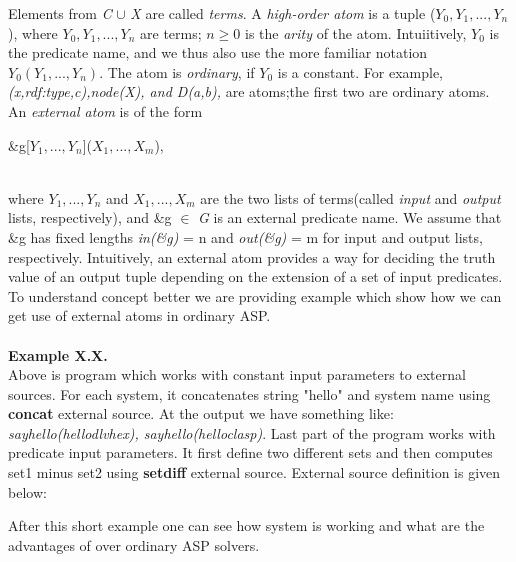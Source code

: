 \documentclass[14pt,a4paper, titlepage]{article}
\begin{document}
Elements from \textit{C} $\cup$ \textit{X} are called \textit{terms}. A \textit{high-order atom} is a tuple ($Y_0, Y_1,...,Y_n$), where $Y_0, Y_1,...,Y_n$ are terms; $ n \ge 0$ is the \textit{arity} of the atom. Intuiitively, $Y_0$ is the predicate name, and we thus also use the more familiar notation $Y_0(Y_1,...,Y_n)$. The atom is \textit{ordinary}, if $Y_0$ is a constant. For example, \textit{(x,rdf:type,c),node(X), and D(a,b),} are atoms;the first two are ordinary atoms. An \textit{external atom} is of the form \\ \centerline{ \&g[$Y_1,...,Y_n$]($X_1,...,X_m$),} \\where $Y_1,...,Y_n$ and $X_1,...,X_m$ are the two lists of terms(called \textit{input} and \textit{output} lists, respectively), and \&g $\in$ \textit{G} is an external predicate name. We assume that \&g has fixed lengths \textit{in(\&g)} = n and \textit{out(\&g)} = m for input and output lists, respectively. Intuitively, an external atom provides a way for deciding the truth value of an output tuple depending on the extension of a set of input predicates.       
\\To understand concept better we are providing example which show how we can get use of external atoms in ordinary ASP.
\\ \textbf{\\Example X.X.}
\\      
Above is \hex{} program  which works with constant input parameters  to external sources. For each system, it concatenates string "hello" and system name using \textbf{concat} external source. At the output we have something like: \textit{sayhello(hellodlvhex), sayhello(helloclasp)}. Last part of the program works with predicate input parameters. It first define two different sets and then computes set1 minus set2 using \textbf{setdiff} external source. External source definition is given below:

After this short example one can see how system is working and what are the advantages of \dlvhex{} over ordinary ASP solvers.  





\newpage
\end{document}
